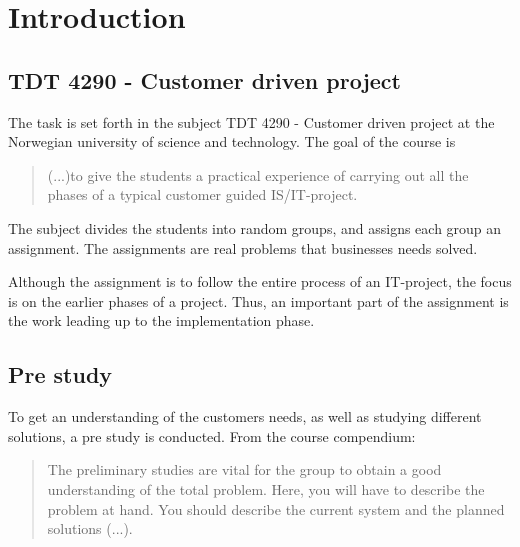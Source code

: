 \documentclass[11pt,a4paper,titlepage,oneside]{report}
\begin{document}
\tableofcontents
{}

\listoffigures
{}

\listoftables
{}

\setcounter{page}{0}


\chapter{Introduction}
\section{TDT 4290 - Customer driven project}
The task is set forth in the subject TDT 4290 - Customer driven project at the Norwegian university of science and technology. The goal of the course is 
\begin{quote}
(...)to give the students a practical experience of carrying out all the phases of a typical customer guided IS/IT-project. \cite{TDT4290:Intro}
\end{quote}
The subject divides the students into random groups, and assigns each group an assignment. The assignments are real problems that businesses needs solved. 

Although the assignment is to follow the entire process of an IT-project, the focus is on the earlier phases of a project. Thus, an important part of the assignment is the work leading up to the implementation phase.

\section{Pre study}
To get an understanding of the customers needs, as well as studying different solutions, a pre study is conducted. From the course compendium:
\begin{quote}
The preliminary studies are vital for the group to obtain a good understanding of the total problem.
Here, you will have to describe the problem at hand. You should describe the current system and the
planned solutions (...).
\end{quote}
\end{document}
